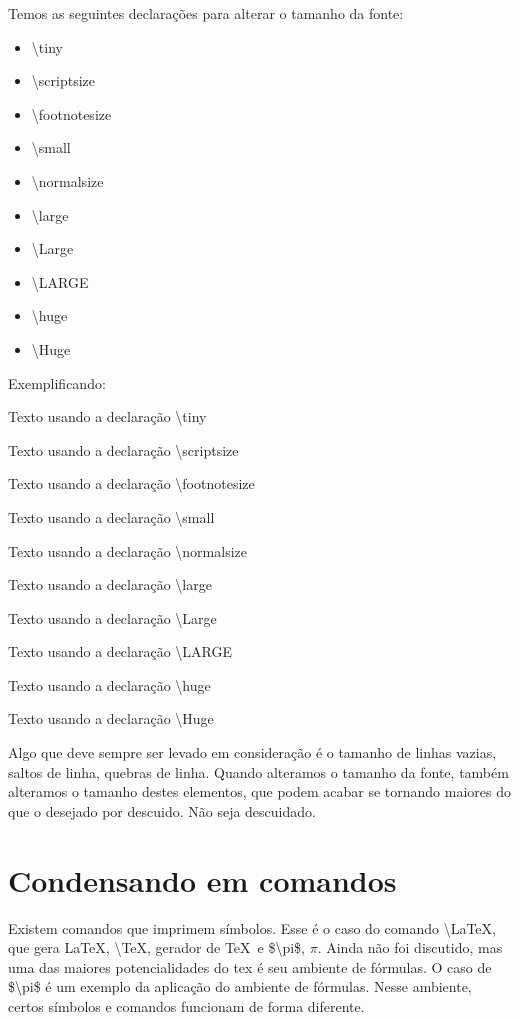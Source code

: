 Temos as seguintes declarações para alterar o tamanho da fonte:
\begin{multicols}{2}
\begin{itemize}
	\item \textbackslash tiny
	\item \textbackslash scriptsize
	\item \textbackslash footnotesize
	\item \textbackslash small
	\item \textbackslash normalsize
	\item \textbackslash large
	\item \textbackslash Large
	\item \textbackslash LARGE
	\item \textbackslash huge
	\item \textbackslash Huge
\end{itemize}
\end{multicols}

Exemplificando:

{\tiny Texto usando a declaração \textbackslash tiny}

{\scriptsize Texto usando a declaração \textbackslash scriptsize}

{\footnotesize Texto usando a declaração \textbackslash footnotesize}

{\small Texto usando a declaração \textbackslash small}

{\normalsize Texto usando a declaração \textbackslash normalsize}

{\large Texto usando a declaração \textbackslash large}

{\Large Texto usando a declaração \textbackslash Large}

{\LARGE Texto usando a declaração \textbackslash LARGE}

{\huge Texto usando a declaração \textbackslash huge}

{\Huge Texto usando a declaração \textbackslash Huge}

Algo que deve sempre ser levado em consideração é o tamanho de linhas vazias, saltos de linha, quebras de linha.
Quando alteramos o tamanho da fonte, também alteramos o tamanho destes elementos, que podem acabar se tornando maiores do que o desejado por descuido.
Não seja descuidado.

\section{Condensando em comandos}
Existem comandos que imprimem símbolos.
Esse é o caso do comando \textbackslash LaTeX, que gera  \LaTeX, \textbackslash TeX, gerador de \TeX\ e \$\textbackslash pi\$, $\pi$.
Ainda não foi discutido, mas uma das maiores potencialidades do tex é seu ambiente de fórmulas.
O caso de \$\textbackslash pi\$ é um exemplo da aplicação do ambiente de fórmulas.
Nesse ambiente, certos símbolos e comandos funcionam de forma diferente.

